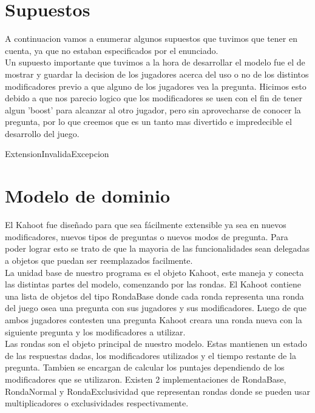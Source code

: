 \documentclass[titlepage,a4paper]{article}
\begin{document}
\section{Supuestos}\label{sec:supuestos}
A continuacion vamos a enumerar algunos supuestos que tuvimos que tener en cuenta, ya que no estaban especificados por el enunciado.\\
\newline
Un supuesto importante que tuvimos a la hora de desarrollar el modelo fue el de mostrar y guardar la decision de los jugadores acerca del uso o no de los distintos modificadores previo a que alguno de los jugadores vea la pregunta. Hicimos esto debido a que nos parecio logico que los modificadores se usen con el fin de tener algun 'boost' para alcanzar al otro jugador, pero sin aprovecharse de conocer la pregunta, por lo que creemos que es un tanto mas divertido e impredecible el desarrollo del juego. 
\item[ExtensionInvalidaExcepcion]

\section{Modelo de dominio}\label{sec:modelo}
El Kahoot fue diseñado para que sea fácilmente extensible ya sea en nuevos modificadores, nuevos tipos de preguntas o nuevos modos de pregunta. Para poder lograr esto se trato de que la mayoria de las funcionalidades sean delegadas a objetos que puedan ser reemplazados facilmente. \\

La unidad base de nuestro programa es el objeto Kahoot, este maneja y conecta las distintas partes del modelo, comenzando por las rondas. El Kahoot contiene una lista de objetos del tipo RondaBase donde cada ronda representa una ronda del juego osea una pregunta con sus jugadores y sus modificadores. Luego de que ambos jugadores contesten una pregunta Kahoot creara una ronda nueva con la siguiente pregunta y los modificadores a utilizar.\\

Las rondas son el objeto principal de nuestro modelo. Estas mantienen un estado de las respuestas dadas, los modificadores utilizados y el tiempo restante de la pregunta. Tambien se encargan de calcular los puntajes dependiendo de los modificadores que se utilizaron. Existen 2 implementaciones de RondaBase, RondaNormal y RondaExclusividad que representan rondas donde se pueden usar multiplicadores o exclusividades respectivamente.\\
\end{document}
